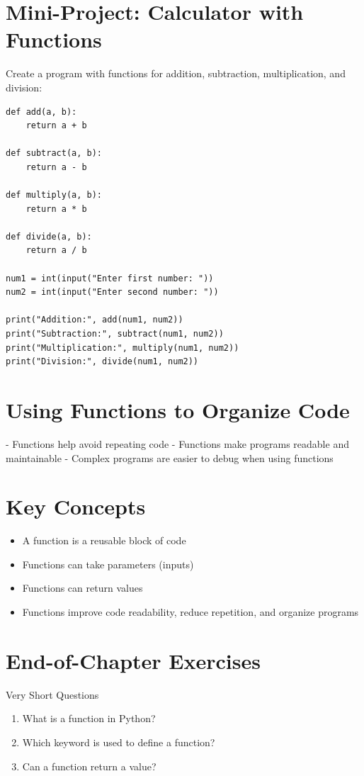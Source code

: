 \section{Mini-Project: Calculator with Functions}

Create a program with functions for addition, subtraction, multiplication, and division:

\begin{verbatim}
def add(a, b):
    return a + b

def subtract(a, b):
    return a - b

def multiply(a, b):
    return a * b

def divide(a, b):
    return a / b

num1 = int(input("Enter first number: "))
num2 = int(input("Enter second number: "))

print("Addition:", add(num1, num2))
print("Subtraction:", subtract(num1, num2))
print("Multiplication:", multiply(num1, num2))
print("Division:", divide(num1, num2))
\end{verbatim}

\section{Using Functions to Organize Code}

- Functions help avoid repeating code  
- Functions make programs readable and maintainable  
- Complex programs are easier to debug when using functions

\section{Key Concepts}

\begin{itemize}
    \item A function is a reusable block of code  
    \item Functions can take parameters (inputs)  
    \item Functions can return values  
    \item Functions improve code readability, reduce repetition, and organize programs  
\end{itemize}

\section{End-of-Chapter Exercises}

\begin{exercise}{Very Short Questions}
\begin{enumerate}
    \item What is a function in Python?  
    \item Which keyword is used to define a function?  
    \item Can a function return a value?  
\end{enumerate}
\end{exercise}

